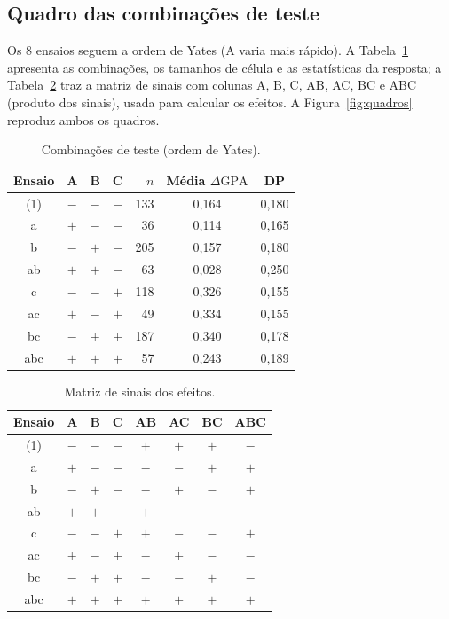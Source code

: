 \documentclass[12pt,a4paper]{article}
\newcommand{\dgpa}{\ensuremath{\Delta\mathrm{GPA}}}
\begin{document}
\subsection{Quadro das combina\c{c}\~oes de teste}
Os 8 ensaios seguem a ordem de Yates (A varia mais r\'apido). A Tabela~\ref{tab:comb} apresenta as combina\c{c}\~oes,
os tamanhos de c\'elula e as estat\'isticas da resposta; a Tabela~\ref{tab:sinais} traz a matriz de sinais
com colunas A, B, C, AB, AC, BC e ABC (produto dos sinais), usada para calcular os efeitos.
A Figura~\ref{fig:quadros} reproduz ambos os quadros.

\begin{table}[H]
\centering
\caption{Combina\c{c}\~oes de teste (ordem de Yates).}\label{tab:comb}
\begin{tabular}{ccccrcc}
\toprule
Ensaio & A & B & C & $n$ & M\'edia \dgpa{} & DP\\
\midrule
(1) & $-$ & $-$ & $-$ & 133 & 0,164 & 0,180\\
a   & $+$ & $-$ & $-$ & 36  & 0,114 & 0,165\\
b   & $-$ & $+$ & $-$ & 205 & 0,157 & 0,180\\
ab  & $+$ & $+$ & $-$ & 63  & 0,028 & 0,250\\
c   & $-$ & $-$ & $+$ & 118 & 0,326 & 0,155\\
ac  & $+$ & $-$ & $+$ & 49  & 0,334 & 0,155\\
bc  & $-$ & $+$ & $+$ & 187 & 0,340 & 0,178\\
abc & $+$ & $+$ & $+$ & 57  & 0,243 & 0,189\\
\bottomrule
\end{tabular}
\end{table}

\begin{table}[H]
\centering
\caption{Matriz de sinais dos efeitos.}\label{tab:sinais}
\begin{tabular}{c|ccccccc}
\toprule
Ensaio & A & B & C & AB & AC & BC & ABC\\
\midrule
(1) & $-$ & $-$ & $-$ & $+$ & $+$ & $+$ & $-$\\
a   & $+$ & $-$ & $-$ & $-$ & $-$ & $+$ & $+$\\
b   & $-$ & $+$ & $-$ & $-$ & $+$ & $-$ & $+$\\
ab  & $+$ & $+$ & $-$ & $+$ & $-$ & $-$ & $-$\\
c   & $-$ & $-$ & $+$ & $+$ & $-$ & $-$ & $+$\\
ac  & $+$ & $-$ & $+$ & $-$ & $+$ & $-$ & $-$\\
bc  & $-$ & $+$ & $+$ & $-$ & $-$ & $+$ & $-$\\
abc & $+$ & $+$ & $+$ & $+$ & $+$ & $+$ & $+$\\
\bottomrule
\end{tabular}
\end{table}
\end{document}
